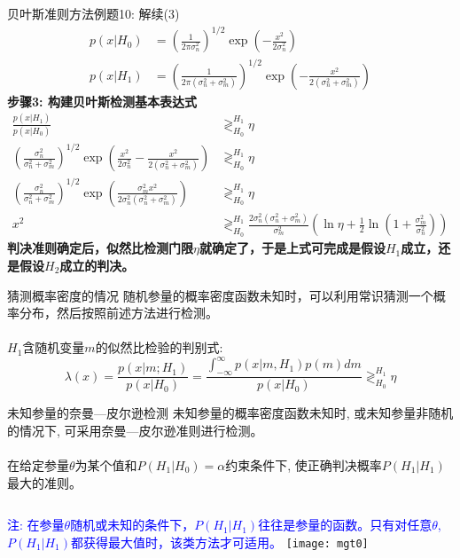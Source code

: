 \begin{frame}[shrink]{贝叶斯准则方法例题10: 解续(3)}
\begin{align*}
p(x|H_0)&=\left(\frac{1}{2\pi\sigma_n^2}\right)^{1/2}\exp\left(-\frac{x^2}{2\sigma_n^2}\right)\\
p(x|H_1)&=\left(\frac{1}{2\pi(\sigma_n^2+\sigma_m^2)}\right)^{1/2}\exp\left(-\frac{x^2}{2(\sigma_n^2+\sigma_m^2)}\right)
\end{align*}
\textbf{步骤3: 构建贝叶斯检测基本表达式}
\begin{align*}
\frac{p(x|H_1)}{p(x|H_0)}&\mathop{\gtrless}_{H_0}^{H_1}\eta\\
\left(\frac{\sigma_n^2}{\sigma_n^2+\sigma_m^2}\right)^{1/2}\exp\left(\frac{x^2}{2\sigma_n^2}-\frac{x^2}{2(\sigma_n^2+\sigma_m^2)}\right)&\mathop{\gtrless}_{H_0}^{H_1}\eta\\
\left(\frac{\sigma_n^2}{\sigma_n^2+\sigma_m^2}\right)^{1/2}\exp\left(\frac{\sigma_m^2x^2}{2\sigma_n^2(\sigma_n^2+\sigma_m^2)}\right)&\mathop{\gtrless}_{H_0}^{H_1}\eta\\
x^2&\mathop{\gtrless}_{H_0}^{H_1}\frac{2\sigma_n^2(\sigma_n^2+\sigma_m^2)}{\sigma_m^2}\left(\ln\eta+\frac{1}{2}\ln\left(1+\frac{\sigma_m^2}{\sigma_n^2}\right)\right)
\end{align*}
\textbf{判决准则确定后，似然比检测门限$\eta$就确定了，于是上式可完成是假设$H_1$成立，还是假设$H_2$成立的判决。}
\end{frame}

\begin{frame}[shrink]{猜测概率密度的情况}
随机参量的概率密度函数未知时，可以利用常识猜测一个概率分布，然后按照前述方法进行检测。\\
~\\
$H_1$含随机变量$m$的似然比检验的判别式:\\
\[\lambda(x)=\frac{p(x|m; H_1)}{p(x|H_0)}=\frac{\int_{-\infty}^{\infty}p(x|m,H_1)p(m)dm}{p(x|H_0)}\mathop{\gtrless}_{H_0}^{H_1}\eta \]
\end{frame}

\begin{frame}[shrink]{未知参量的奈曼---皮尔逊检测}
未知参量的概率密度函数未知时, 或未知参量非随机的情况下, 可采用奈曼---皮尔逊准则进行检测。\\
~\\

在给定参量$\theta$为某个值和$P(H_1|H_0)=\alpha$约束条件下, 使正确判决概率$P(H_1|H_1)$最大的准则。\\
\begin{columns}
	\textcolor{blue}{注: 在参量$\theta$随机或未知的条件下，$P(H_1|H_1)$往往是参量的函数。只有对任意$\theta$, $P(H_1|H_1)$都获得最大值时，该类方法才可适用。}
	\texttt{[image: mgt0]}
\end{columns}
\end{frame}

